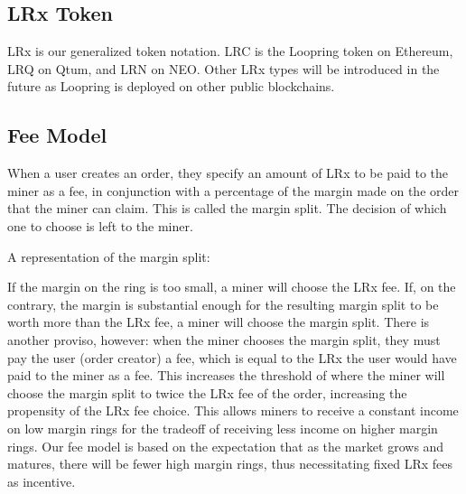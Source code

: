 \documentclass[UTF8,nofonts]{article}
\makeatletter
\newenvironment{figurehere}
 {\def\@captype{figure}}
 {}
\makeatother
\begin{document}
\begin{multicols}{2}
\section{LRx Token\label{sec:token}}
LRx is our generalized token notation. LRC is the Loopring token on Ethereum, LRQ on Qtum, and LRN on NEO. Other LRx types will be introduced in the future as Loopring is deployed on other public blockchains.

\subsection{Fee Model\label{sec:fee_model}} 
When a user creates an order, they specify an amount of LRx to be paid to the miner as a fee, in conjunction with a percentage of the margin made on the order that the miner can claim. This is called the margin split. The decision of which one to choose is left to the miner.

A representation of the margin split:


If the margin on the ring is too small, a miner will choose the LRx fee. If, on the contrary, the margin is substantial enough for the resulting margin split to be worth more than the LRx fee, a miner will choose the margin split. There is another proviso, however: when the miner chooses the margin split, they must pay the user (order creator) a fee, which is equal to the LRx the user would have paid to the miner as a fee. This increases the threshold of where the miner will choose the margin split to twice the LRx fee of the order, increasing the propensity of the LRx fee choice. This allows miners to receive a constant income on low margin rings for the tradeoff of receiving less income on higher margin rings. Our fee model is based on the expectation that as the market grows and matures, there will be fewer high margin rings, thus necessitating fixed LRx fees as incentive.

\begin{center}
\begin{figurehere}
\centering
{}
\end{figurehere}
\end{center}
\end{multicols}
\end{document}
